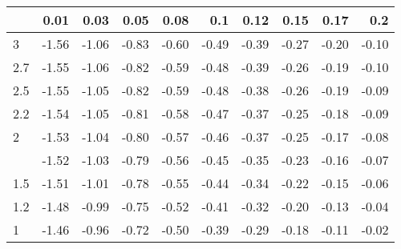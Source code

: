 
\begin{tabular}{lrrrrrrrrr}
\toprule
  & 0.01 & 0.03 & 0.05 & 0.08 & 0.1 & 0.12 & 0.15 & 0.17 & 0.2\\
\midrule
3 & -1.56 & -1.06 & -0.83 & -0.60 & -0.49 & -0.39 & -0.27 & -0.20 & -0.10\\
2.7 & -1.55 & -1.06 & -0.82 & -0.59 & -0.48 & -0.39 & -0.26 & -0.19 & -0.10\\
2.5 & -1.55 & -1.05 & -0.82 & -0.59 & -0.48 & -0.38 & -0.26 & -0.19 & -0.09\\
2.2 & -1.54 & -1.05 & -0.81 & -0.58 & -0.47 & -0.37 & -0.25 & -0.18 & -0.09\\
2 & -1.53 & -1.04 & -0.80 & -0.57 & -0.46 & -0.37 & -0.25 & -0.17 & -0.08\\
\addlinespace
1.7 & -1.52 & -1.03 & -0.79 & -0.56 & -0.45 & -0.35 & -0.23 & -0.16 & -0.07\\
1.5 & -1.51 & -1.01 & -0.78 & -0.55 & -0.44 & -0.34 & -0.22 & -0.15 & -0.06\\
1.2 & -1.48 & -0.99 & -0.75 & -0.52 & -0.41 & -0.32 & -0.20 & -0.13 & -0.04\\
1 & -1.46 & -0.96 & -0.72 & -0.50 & -0.39 & -0.29 & -0.18 & -0.11 & -0.02\\
\bottomrule
\end{tabular}
